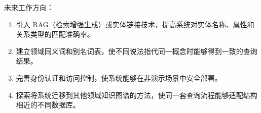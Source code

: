 \documentclass[12pt,a4paper]{article}
\begin{document}
\begin{thesisconclusion}
未来工作方向：
\begin{enumerate}[(1)]
    \item 引入 RAG（检索增强生成）或实体链接技术，提高系统对实体名称、属性和关系类型的匹配准确率。
    \item 建立领域同义词和别名词表，使不同说法指代同一概念时能够得到一致的查询结果。
    \item 完善身份认证和访问控制，使系统能够在非演示场景中安全部署。
    \item 探索将系统迁移到其他领域知识图谱的方法，使同一套查询流程能够适配结构相近的不同数据库。
\end{enumerate}

\end{thesisconclusion}

\appendix

\end{document}
